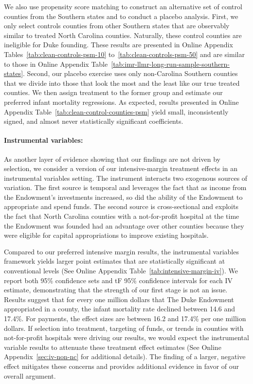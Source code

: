 \documentclass[12pt]{article}
\begin{document}
We also use propensity score matching to construct an alternative set of control counties from the Southern states and to conduct a placebo analysis. First, we only select controls counties from other Southern states that are observably similar to treated North Carolina counties. 
Naturally, these control counties are ineligible for Duke founding. 
These results are presented in Online Appendix Tables~\ref{tab:clean-controls-psm-10} to~\ref{tab:clean-controls-psm-50} and are similar to those in Online Appendix Table~\ref{tab:imr-llmr-long-run-sample-southern-states}. 
Second, our placebo exercise uses only  non-Carolina Southern counties that we divide into those that look the most and the least like our true treated counties. 
We then assign treatment to the former group and estimate our preferred infant mortality regressions. 
As expected, results presented in Online Appendix Table~\ref{tab:clean-control-counties-psm} yield small, inconsistently signed, and almost never statistically significant coefficients. 

\paragraph{Instrumental variables:} 
As another layer of evidence showing that our findings are not driven by selection, we consider a version of our intensive-margin treatment effects in an instrumental variables setting. 
The instrument interacts two exogenous sources of variation.
The first source is temporal and leverages the fact that as income from the Endowment's investments increased, so did the ability of the Endowment to appropriate and spend funds. 
The second source is cross-sectional and exploits the fact that North Carolina counties with a not-for-profit hospital at the time the Endowment was founded had an advantage over other counties because they were eligible for capital appropriations to improve existing hospitals. 

Compared to our preferred intensive margin results, the instrumental variables framework yields larger point estimates that are statistically significant at conventional levels (See Online Appendix Table~\ref{tab:intensive-margin-iv}). 
We report both  95\% confidence sets and tF 95\% confidence intervals  for each IV estimate, demonstrating that the strength of our first stage is not an issue. 
Results suggest that for every one million dollars that The Duke Endowment appropriated in a county, the infant mortality rate declined between 14.6 and 17.4\%. 
For payments, the effect sizes are between 16.2 and 17.4\% per one million dollars.
If selection into treatment, targeting of funds, or trends in counties with not-for-profit hospitals were driving our results, we would expect the instrumental variable results to attenuate these treatment effect estimates (See Online Appendix~\ref{sec:iv-non-nc} for additional details). 
The finding of a larger, negative effect mitigates these concerns and provides additional evidence in favor of our overall argument.
\end{document}
